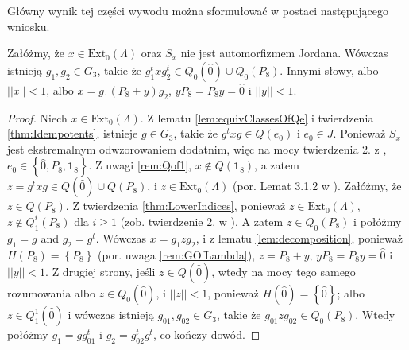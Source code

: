 {Główny wynik tej części wywodu można sformułować w postaci następującego wniosku.
\begin{Corollary}
\label{cor:q0}
    Załóżmy, że $x \in \text{Ext}_{0}(\Lambda)$ oraz $S_{x}$ nie jest
    automorfizmem Jordana.
    Wówczas istnieją $g_{1}, g_{2} \in G_{3}$,
    takie że $g_{1}^{t} x g_{2}^{t} \in Q_{0}(\hat{0}) \cup Q_{0}(P_{8})$.
    Innymi słowy, albo $||x|| < 1$,
    albo
    $x = g_{1} (P_{8} + y) g_{2}$,  $y P_{8} = P_{8} y = \hat{0}$
    i $|| y || < 1$.
\end{Corollary}
\begin{proof}
Niech $x \in  \text{Ext}_{0}(\Lambda)$.
    Z lematu \ref{lem:equivClassesOfQe} i twierdzenia \ref{thm:Idempotents},
    istnieje $g \in G_{3}$, takie że
    $g^{t} x g \in Q(e_{0})$ i $e_{0} \in J$.
    Ponieważ $S_{x}$ jest ekstremalnym odwzorowaniem dodatnim, więc na mocy
    twierdzenia 2. z \cite{miller2015stable},
    $e_{0} \in \left \{ \hat{0}, P_{8}, \mathbf{1}_{8} \right \}$.
    Z uwagi \ref{rem:Qof1}, $x \notin Q(\mathbf{1}_{8})$, a zatem
    $z = g^{t} x g \in Q(\hat{0}) \cup Q(P_{8})$,
    i $z \in \text{Ext}_{0}(\Lambda)$
    (por. Lemat 3.1.2 w \cite{Stormer2013}).
    Załóżmy, że $z \in Q(P_{8})$.
    Z twierdzenia \ref{thm:LowerIndices},
    ponieważ $z \in \text{Ext}_{0}(\Lambda)$,
    $z \notin Q_{1}^{i}(P_{8})$
    dla $i \geq 1$ (zob.  twierdzenie 2. w \cite{miller2015stable}).
    A zatem $z \in Q_{0}(P_{8})$ i połóżmy $g_{1} = g$ and $g_{2} = g^{t}$.
    Wówczas $x = g_{1} z g_{2}$,
    i z lematu \ref{lem:decomposition}, ponieważ
    $H(P_{8}) = \left \{ P_{8} \right \}$
    (por. uwaga \ref{rem:GOfLambda}),
    $z = P_{8} + y$,  $y P_{8} = P_{8} y = \hat{0}$ i $||y|| < 1$.
    Z drugiej strony, jeśli $z \in Q(\hat{0})$,
    wtedy na mocy tego samego rozumowania albo $z \in Q_{0}(\hat{0})$,
    i $||z|| < 1$, ponieważ $H(\hat{0}) = \left \{ \hat{0} \right \}$; albo
    $z \in Q_{1}^{1}(\hat{0})$ i wówczas istnieją $g_{01}, g_{02} \in G_{3}$,
    takie że $g_{01} z g_{02} \in Q_{0}(P_{8})$.
    Wtedy połóżmy $g_{1} = g g_{01}^{t}$ i $g_{2} = g_{02}^{t} g^{t}$,
    co kończy dowód.
\end{proof}

}
